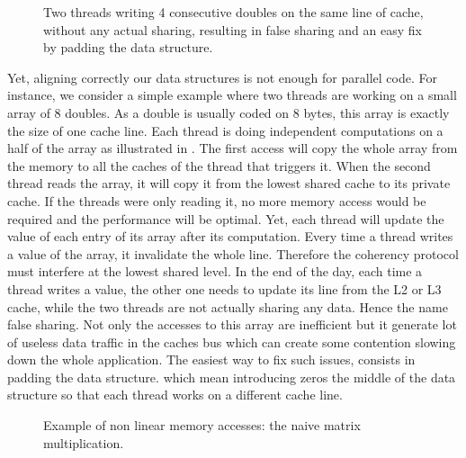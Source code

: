 \begin{figure}[htb]
    \centering
    
    \caption[Example of false sharing.]{Two threads writing 4 consecutive doubles on the same line of cache, without any actual sharing, resulting in false sharing and an easy fix by padding the data structure.}
    \label{fig:false-sharing}
\end{figure}

Yet, aligning correctly our data structures is not enough for parallel code.
For instance, we  consider a simple example where two threads are working on a small array of $8$ doubles.
As a double is usually coded on $8$ bytes, this array is exactly the size of one cache line.
Each thread is doing independent computations on a half of the array as illustrated in .
The first access will copy the whole array from the memory to all the caches of the thread that triggers it.
When the second thread reads the array, it will copy it from the lowest shared cache to its private cache.
If the threads were only reading it, no more memory access would be required and the performance will be optimal.
Yet, each thread will update the value of each entry of its array after its computation.
Every time a thread writes a value of the array, it invalidate the whole line.
Therefore the coherency protocol must interfere at the lowest shared level.
In the end of the day, each time a thread writes a value, the other one needs to update its line from the L2 or L3 cache, while the two threads are not actually sharing any data.
Hence the name false sharing.
Not only the accesses to this array are inefficient but it generate lot of useless data traffic in the caches bus which can create some contention slowing down the whole application.
The easiest way to fix such issues, consists in padding the data structure. which mean introducing zeros the middle of the data structure so that each thread works on a different cache line.

\begin{figure}[htb]
    \centering
    
    \caption[Example of non linear memory accesses.]{Example of non linear memory accesses: the naive matrix multiplication.}
    \label{fig:mat-mult}
\end{figure}

